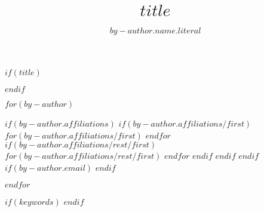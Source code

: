 $if(title)$
\title{$title$}
$endif$

$for(by-author)$
\author{$by-author.name.literal$}%
$if(by-author.affiliations)$
$if(by-author.affiliations/first)$
$for(by-author.affiliations/first)$
%
$endfor$
$if(by-author.affiliations/rest/first)$
$for(by-author.affiliations/rest/first)$
%
$endfor$
$endif$
$endif$
$endif$
$if(by-author.email)$
$endif$

$endfor$

$if(keywords)$
$endif$